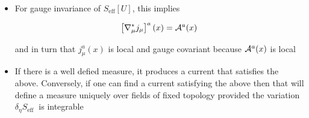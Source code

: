 \begin{itemize}
To see this, use $D \hat{\gamma}_{5}=-\gamma_{5} D$, $D \hat{P}_{-}=-P_{+} D$, $P_{+} D=-D \hat{P}_-$, $P_{+}^{2}=P_{+}$, 
$\hat{P}_{-}^{2}=\left(1-\hat{\gamma}_{5}\right)^{2} / 4 =\frac{1}{4}-\frac{1}{2} \hat \gamma_{5}+\frac{\hat\gamma_{5}^{2}}{4} =\hat{P}^-$
first noting that
\begin{equation}
 \eta_{\mu}=-\nabla_{\mu} \omega \quad \Rightarrow \delta_{\eta} D=[R(\omega), D]   
\end{equation}
so
\begin{equation}
    \begin{aligned}
 \delta S&=-\operatorname{tr}\left[\delta_{\eta} D \hat{P}_{-} D^{-1} P_{+}\right]+i \sum_{x} \eta_{a}^{\mu}(x) \hat{J}_{a}^{\mu}(x) \\
& =-\text{tr}\left[[R(\omega), D] \hat{P}_{-} D^{-1} P_{+}\right]-i \sum\left(\nabla_{\mu} \omega\right)^a {j} _\mu^{a} \\
& =-\operatorname{tr}\left[R(\omega) D \hat{P}_{-} D^{-1} P_{+}-R(\omega) \hat{P}_{-} D^{-1} P_{+} D\right]-i \sum_{x}\left[U_{\mu}(x) \omega(x+\mu) U_{\mu}^{-1}(x)-\omega(x)\right\}^a j_{\mu}^{a}(x) \\
& =+\operatorname{tr}\left[R(\omega)\left(P_{+}^{2}+\hat{P}_{-}^{2}\right)\right]-i \sum_{x}\left[U_{\mu}(x-\hat{\mu}) \omega(x) U_{\mu}^{-1}(x-\mu)\right]^{a} j_\mu^a(x-\mu)-\omega^{a}(x)j_{\mu}^{a}(x) \\
& =\operatorname{tr}\left[R(\omega)\left(1-\frac{a}{2} D \gamma_5\right)\right]-i \sum_{x} \omega^{a}(x) (\nabla^{\ast}_{\mu} j_\mu)^{a}(x) \\
& =i a^{4} \sum_{x} \omega^{a}(x)\left({\cal A}^{a}(x)-\left(\nabla_{\mu}^{*} j_{\mu}(x)\right)^{a}\right)
\end{aligned}
\end{equation}



\item For gauge invariance of \(S_{\text{eff}}[U]\), this implies

\begin{equation}
    \left[\nabla_{\mu}^{\ast} j_{\mu}\right]^{a}(x)={\cal A}^{a}(x)
\end{equation}

and in turn that \(j_{\mu}^{a}(x)\) is local and gauge covariant because \({\cal A}^{a}(x)\) is local

\item If there is a well defied measure, it produces a current that satisfies the above. Conversely, if one can find a current satisfying the above then that will define a measure uniquely over fields of fixed topology provided the variation \(\delta_{\eta} S_{\text {eff }}\) is integrable



\end{itemize}
